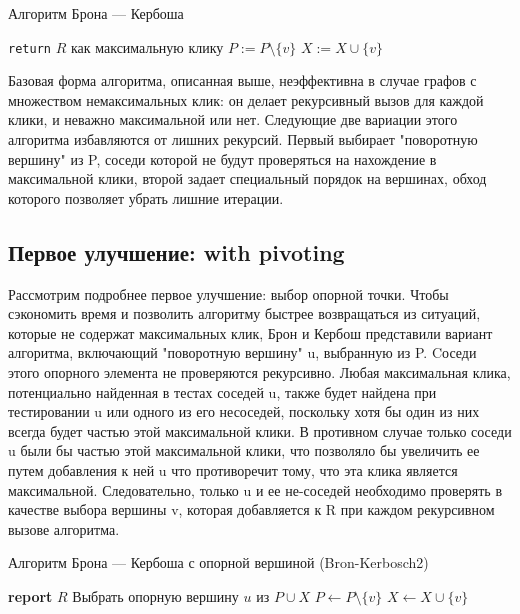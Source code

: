 \documentclass{article}
\begin{document}
\begin{algorithm}
\caption{Алгоритм Брона — Кербоша}
\begin{algorithmic}[1]
        \State \texttt{return} $R$ как максимальную клику
    \EndIf
        \State {}
        \State $P := P \setminus \{v\}$
        \State $X := X \cup \{v\}$
    \EndFor
\EndProcedure
\end{algorithmic}
\end{algorithm}

Базовая форма алгоритма, описанная выше, неэффективна в случае графов с множеством немаксимальных клик: он делает рекурсивный вызов для каждой клики, и неважно максимальной или нет. Следующие две вариации этого алгоритма избавляются от лишних рекурсий. Первый выбирает "поворотную вершину" из P, соседи которой не будут проверяться на нахождение в максимальной клики, второй задает специальный порядок на вершинах, обход которого позволяет убрать лишние итерации.

\subsection{Первое улучшение: with pivoting}
Рассмотрим подробнее первое улучшение: выбор опорной точки. Чтобы сэкономить время и позволить алгоритму быстрее возвращаться из ситуаций, которые не содержат максимальных клик, Брон и Кербош представили \cite{Bron1973} вариант алгоритма, включающий "поворотную вершину" u, выбранную из P. Cоседи этого опорного элемента не проверяются рекурсивно. Любая максимальная клика, потенциально найденная в тестах соседей u, также будет найдена при тестировании u или одного из его несоседей, поскольку хотя бы один из них всегда будет частью этой максимальной клики. В противном случае только соседи u были бы частью этой максимальной клики, что позволяло бы увеличить ее путем добавления к ней u что противоречит тому, что эта клика является максимальной. Следовательно, только u и ее не-соседей необходимо проверять в качестве выбора вершины v, которая добавляется к R при каждом рекурсивном вызове алгоритма.

\begin{algorithm}
\caption{Алгоритм Брона — Кербоша с опорной вершиной (Bron-Kerbosch2)}
\label{alg:bronkerbosch2}
\begin{algorithmic}[1]
        \State \textbf{report} $R$ 
    \EndIf
    \State Выбрать опорную вершину $u$ из $P \cup X$
        \State {}
        \State $P \gets P \setminus \{v\}$
        \State $X \gets X \cup \{v\}$
    \EndFor
\EndProcedure
\end{algorithmic}
\end{algorithm}
\end{document}
